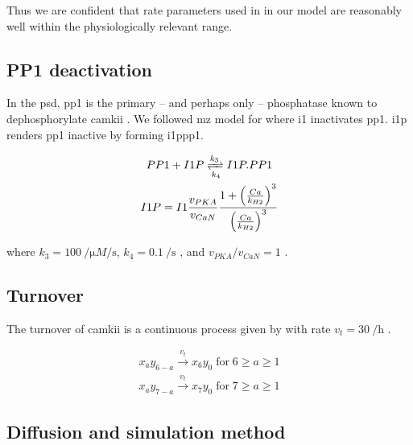 \documentclass[9pt,lineno,doublespacing]{elife}
\begin{document}
Thus we are confident that rate parameters used in  in our model
are reasonably well within the physiologically relevant range.

\subsection{PP1 deactivation}\label{subsec:pp1_deactivation} 

In the \gls{psd}, \gls{pp1} is the primary -- and perhaps only -- phosphatase
known to dephosphorylate \gls{camkii} \citep{strack_translocation_1997}. We
followed \gls{mz} model for  where \gls{i1} inactivates \gls{pp1}. 
\Gls{i1p} renders \gls{pp1} inactive by forming \gls{i1ppp1}. 

\begin{equation}\label{eq:i1pandpp1}
    \begin{gathered}
        PP1 + I1P \xrightleftharpoons[k_4]{k_3} I1P.PP1 \\
        I1P = I1 \frac{v_{PKA}}{v_{CaN}} 
            \frac{1+\left(\frac{Ca}{k_{H2}}\right)^3}{\left(\frac{Ca}{k_{H2}}\right)^3}
    \end{gathered}
\end{equation}

\noindent where $k_3=\SI{100}{\per\micro M\per\second}$,
$k_4=\SI{0.1}{\per\second}$ \citep{endo_multiple_1996}, and $v_{PKA}/v_{CaN}=1$
\citep{miller_stability_2005}.

\subsection{Turnover}\label{turnover}

The turnover of \gls{camkii} is a continuous process given by  with rate
$v_{t}=\SI{30}{\per\hour}$ \citep{ehlers_activity_2003}.

\begin{equation} \label{eq:turnover}
    \begin{gathered}
        x_ay_{6-a} \xrightarrow{v_t} x_6y_0\; \text{for}\; 6\ge a\ge 1 \\
        x_ay_{7-a} \xrightarrow{v_t} x_7y_0\; \text{for}\; 7\ge a\ge 1
    \end{gathered}
\end{equation}

\subsection{Diffusion and simulation method}\label{subsec:simulator}
\end{document}
